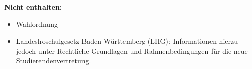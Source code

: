 
\toccontents

\null
\textbf{Nicht enthalten:}
\begin{itemize}
	\item Wahlordnung
	\item Landeshoschulgesetz Baden-Württemberg (LHG): Informationen hierzu jedoch unter Rechtliche Grundlagen und Rahmenbedingungen für die neue Studierendenvertretung.
\end{itemize}




\clearpage